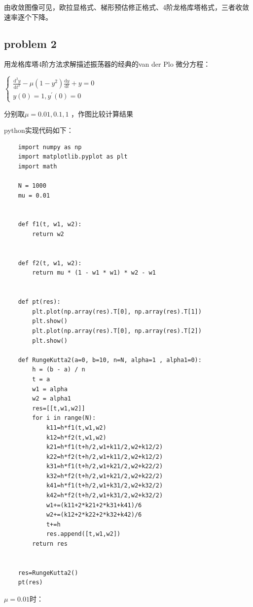 \documentclass[UTF8]{ctexart}
\begin{document}
由收敛图像可见，欧拉显格式、梯形预估修正格式、4阶龙格库塔格式，三者收敛速率逐个下降。


\subsection{problem 2}

用龙格库塔4阶方法求解描述振荡器的经典的van der Plo 微分方程：

$\left\{\begin{array}{l}{\frac{\mathrm{d}^{2} y}{\mathrm{d} t^{2}}-\mu\left(1-y^{2}\right) \frac{\mathrm{d} y}{\mathrm{d} t}+y=0} \\ {y(0)=1, y^{\prime}(0)=0}\end{array}\right.$

分别取$ \mu =0.01 ,0.1 ,1$ ，作图比较计算结果

python实现代码如下：

\begin{lstlisting}	
	import numpy as np
	import matplotlib.pyplot as plt
	import math

	N = 1000
	mu = 0.01


	def f1(t, w1, w2):
	    return w2


	def f2(t, w1, w2):
	    return mu * (1 - w1 * w1) * w2 - w1


	def pt(res):
	    plt.plot(np.array(res).T[0], np.array(res).T[1])
	    plt.show()
	    plt.plot(np.array(res).T[0], np.array(res).T[2])
	    plt.show()

	def RungeKutta2(a=0, b=10, n=N, alpha=1 , alpha1=0):
	    h = (b - a) / n
	    t = a
	    w1 = alpha
	    w2 = alpha1
	    res=[[t,w1,w2]]
	    for i in range(N):
	        k11=h*f1(t,w1,w2)
	        k12=h*f2(t,w1,w2)
	        k21=h*f1(t+h/2,w1+k11/2,w2+k12/2)
	        k22=h*f2(t+h/2,w1+k11/2,w2+k12/2)
	        k31=h*f1(t+h/2,w1+k21/2,w2+k22/2)
	        k32=h*f2(t+h/2,w1+k21/2,w2+k22/2)
	        k41=h*f1(t+h/2,w1+k31/2,w2+k32/2)
	        k42=h*f2(t+h/2,w1+k31/2,w2+k32/2)
	        w1+=(k11+2*k21+2*k31+k41)/6
	        w2+=(k12+2*k22+2*k32+k42)/6
	        t+=h
	        res.append([t,w1,w2])
	    return res


	res=RungeKutta2()
	pt(res)
\end{lstlisting}
$ \mu =0.01 $时：
\end{document}
